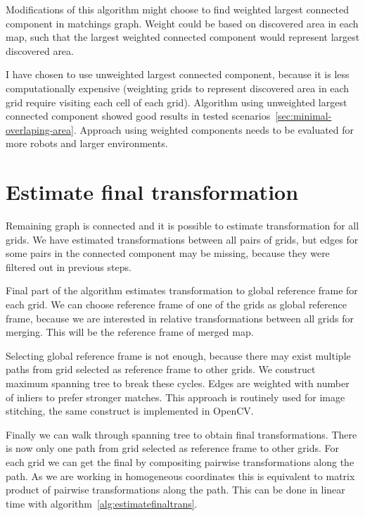 Modifications of this algorithm might choose to find weighted largest connected component in matchings graph. Weight could be based on discovered area in each map, such that the largest weighted connected component would represent largest discovered area.

I have chosen to use unweighted largest connected component, because it is less computationally expensive (weighting grids to represent discovered area in each grid require visiting each cell of each grid). Algorithm using unweighted largest connected component showed good results in tested scenarios~\ref{sec:minimal-overlaping-area}. Approach using weighted components needs to be evaluated for more robots and larger environments.


\section{Estimate final transformation} %
\label{sec:estimatefinaltransformation}

Remaining graph is connected and it is possible to estimate transformation for all grids. We have estimated transformations between all pairs of grids, but edges for some pairs in the connected component may be missing, because they were filtered out in previous steps.

Final part of the algorithm estimates transformation to global reference frame for each grid. We can choose reference frame of one of the grids as global reference frame, because we are interested in relative transformations between all grids for merging. This will be the reference frame of merged map.

Selecting global reference frame is not enough, because there may exist multiple paths from grid selected as reference frame to other grids. We construct maximum spanning tree to break these cycles. Edges are weighted with number of inliers to prefer stronger matches. This approach is routinely used for image stitching, the same construct is implemented in \gls{OpenCV}.

Finally we can walk through spanning tree to obtain final transformations. There is now only one path from grid selected as reference frame to other grids. For each grid we can get the final by compositing pairwise transformations along the path. As we are working in homogeneous coordinates this is equivalent to matrix product of pairwise transformations along the path. This can be done in linear time with algorithm~\ref{alg:estimatefinaltrans}.

